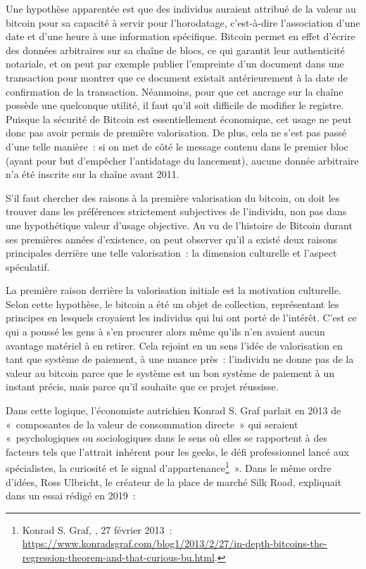 Une hypothèse apparentée est que des individus auraient attribué de la valeur au bitcoin pour sa capacité à servir pour l'horodatage, c'est-à-dire l'association d'une date et d'une heure à une information spécifique. Bitcoin permet en effet d'écrire des données arbitraires sur sa chaîne de blocs, ce qui garantit leur authenticité notariale, et on peut par exemple publier l'empreinte d'un document dans une transaction pour montrer que ce document existait antérieurement à la date de confirmation de la transaction. Néanmoins, pour que cet ancrage sur la chaîne possède une quelconque utilité, il faut qu'il soit difficile de modifier le registre. Puisque la sécurité de Bitcoin est essentiellement économique, cet usage ne peut donc pas avoir permis de première valorisation. De plus, cela ne s'est pas passé d'une telle manière~: si on met de côté le message contenu dans le premier bloc (ayant pour but d'empêcher l'antidatage du lancement), aucune donnée arbitraire n'a été inscrite sur la chaîne avant 2011.


S'il faut chercher des raisons à la première valorisation du bitcoin, on doit les trouver dans les préférences strictement subjectives de l'individu, non pas dans une hypothétique valeur d'usage objective. Au vu de l'histoire de Bitcoin durant ses premières années d'existence, on peut observer qu'il a existé deux raisons principales derrière une telle valorisation~: la dimension culturelle et l'aspect spéculatif.

La première raison derrière la valorisation initiale est la motivation culturelle. Selon cette hypothèse, le bitcoin a été un objet de collection, représentant les principes en lesquels croyaient les individus qui lui ont porté de l'intérêt. C'est ce qui a poussé les gens à s'en procurer alors même qu'ils n'en avaient aucun avantage matériel à en retirer. Cela rejoint en un sens l'idée de valorisation en tant que système de paiement, à une nuance près~: l'individu ne donne pas de la valeur au bitcoin parce que le système est un bon système de paiement à un instant précis, mais parce qu'il souhaite que ce projet réussisse.

Dans cette logique, l'économiste autrichien Konrad S. Graf parlait en 2013 de «~composantes de la valeur de consommation directe~» qui seraient «~psychologiques ou sociologiques dans le sens où elles se rapportent à des facteurs tels que l'attrait inhérent pour les geeks, le défi professionnel lancé aux spécialistes, la curiosité et le signal d'appartenance\footnote{Konrad S. Graf, , 27 février 2013~: \url{https://www.konradsgraf.com/blog1/2013/2/27/in-depth-bitcoins-the-regression-theorem-and-that-curious-bu.html}.}~». Dans le même ordre d'idées, Ross Ulbricht, le créateur de la place de marché Silk Road, expliquait dans un essai rédigé en 2019~:

